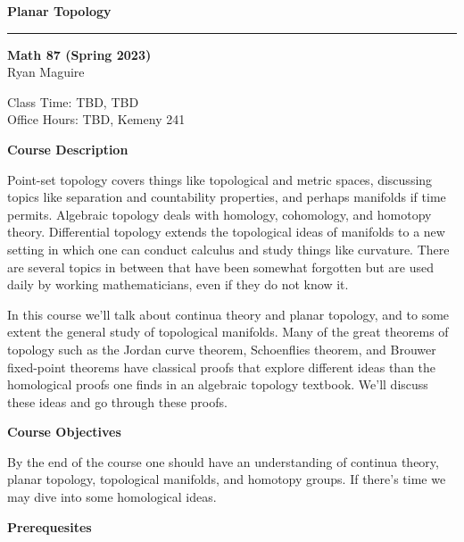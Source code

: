 \documentclass{article}
\begin{document}
    \LARGE
    \textbf{Planar Topology}
    \hrule\par\hfill\par
    \normalsize
    \textbf{Math 87 (Spring 2023)}\\
    Ryan Maguire\\
    \color{gray}{Ryan.J.Maguire.GR@dartmouth.edu}
    \par\vspace{0.5cm}
    \color{black}
    Class Time: TBD, TBD\\
    Office Hours: TBD, Kemeny 241\\
    \par\vspace{0.5cm}
    \textbf{Course Description}
    \par\hfill\par
    Point-set topology covers things like topological and metric spaces,
    discussing topics like separation and countability properties, and perhaps
    manifolds if time permits. Algebraic topology deals with homology,
    cohomology, and homotopy theory. Differential topology extends the
    topological ideas of manifolds to a new setting in which one can conduct
    calculus and study things like curvature. There are several topics in
    between that have been somewhat forgotten but are used daily by working
    mathematicians, even if they do not know it.
    \par\hfill\par
    In this course we’ll talk about continua theory and planar topology, and to
    some extent the general study of topological manifolds. Many of the great
    theorems of topology such as the Jordan curve theorem, Schoenflies theorem,
    and Brouwer fixed-point theorems have classical proofs that explore
    different ideas than the homological proofs one finds in an algebraic
    topology textbook. We’ll discuss these ideas and go through these proofs.
    \par\hfill\par
    \textbf{Course Objectives}
    \par\hfill\par
    By the end of the course one should have an understanding of continua
    theory, planar topology, topological manifolds, and homotopy groups. If
    there’s time we may dive into some homological ideas.
    \par\hfill\par
    \textbf{Prerequesites}
    \par\hfill\par
\end{document}
